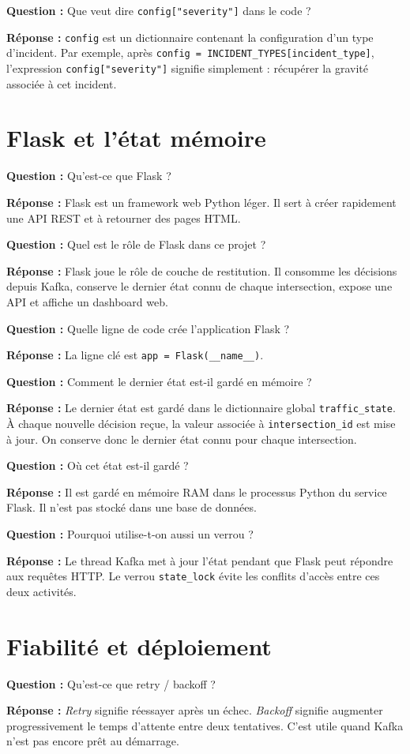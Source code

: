 \documentclass[11pt,a4paper]{article}
\newcommand{\question}[1]{
  \begin{questionbox}
  \textbf{Question :} #1
  \end{questionbox}
}
\newcommand{\reponse}{\textbf{Réponse : }}
\begin{document}
\question{Que veut dire \texttt{config["severity"]} dans le code ?}
\reponse \texttt{config} est un dictionnaire contenant la configuration d'un type d'incident. Par exemple, après \texttt{config = INCIDENT\_TYPES[incident\_type]}, l'expression \texttt{config["severity"]} signifie simplement : récupérer la gravité associée à cet incident.

\section{Flask et l'état mémoire}

\question{Qu'est-ce que Flask ?}
\reponse Flask est un framework web Python léger. Il sert à créer rapidement une API REST et à retourner des pages HTML.

\question{Quel est le rôle de Flask dans ce projet ?}
\reponse Flask joue le rôle de couche de restitution. Il consomme les décisions depuis Kafka, conserve le dernier état connu de chaque intersection, expose une API et affiche un dashboard web.

\question{Quelle ligne de code crée l'application Flask ?}
\reponse La ligne clé est \texttt{app = Flask(\_\_name\_\_)}.

\question{Comment le dernier état est-il gardé en mémoire ?}
\reponse Le dernier état est gardé dans le dictionnaire global \texttt{traffic\_state}. À chaque nouvelle décision reçue, la valeur associée à \texttt{intersection\_id} est mise à jour. On conserve donc le dernier état connu pour chaque intersection.

\question{Où cet état est-il gardé ?}
\reponse Il est gardé en mémoire RAM dans le processus Python du service Flask. Il n'est pas stocké dans une base de données.

\question{Pourquoi utilise-t-on aussi un verrou ?}
\reponse Le thread Kafka met à jour l'état pendant que Flask peut répondre aux requêtes HTTP. Le verrou \texttt{state\_lock} évite les conflits d'accès entre ces deux activités.

\section{Fiabilité et déploiement}

\question{Qu'est-ce que retry / backoff ?}
\reponse \textit{Retry} signifie réessayer après un échec. \textit{Backoff} signifie augmenter progressivement le temps d'attente entre deux tentatives. C'est utile quand Kafka n'est pas encore prêt au démarrage.
\end{document}
